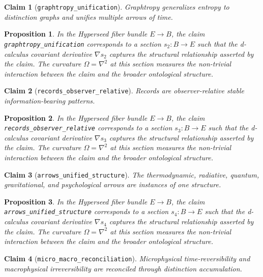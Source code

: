 \documentclass{article}
\newtheorem{claim}{Claim}
\newtheorem{proposition}{Proposition}
\begin{document}
\begin{claim}[\texttt{graphtropy_unification}]
Graphtropy generalizes entropy to distinction graphs and unifies multiple arrows of time.
\end{claim}

\begin{proposition}
In the Hyperseed fiber bundle $E \to B$, the claim \texttt{graphtropy_unification} corresponds to a section $s_2: B \to E$ such that the d-calculus covariant derivative $\nabla s_2$ captures the structural relationship asserted by the claim. The curvature $\Omega = \nabla^2$ at this section measures the non-trivial interaction between the claim and the broader ontological structure.
\end{proposition}

\begin{claim}[\texttt{records_observer_relative}]
Records are observer-relative stable information-bearing patterns.
\end{claim}

\begin{proposition}
In the Hyperseed fiber bundle $E \to B$, the claim \texttt{records_observer_relative} corresponds to a section $s_3: B \to E$ such that the d-calculus covariant derivative $\nabla s_3$ captures the structural relationship asserted by the claim. The curvature $\Omega = \nabla^2$ at this section measures the non-trivial interaction between the claim and the broader ontological structure.
\end{proposition}

\begin{claim}[\texttt{arrows_unified_structure}]
The thermodynamic, radiative, quantum, gravitational, and psychological arrows are instances of one structure.
\end{claim}

\begin{proposition}
In the Hyperseed fiber bundle $E \to B$, the claim \texttt{arrows_unified_structure} corresponds to a section $s_4: B \to E$ such that the d-calculus covariant derivative $\nabla s_4$ captures the structural relationship asserted by the claim. The curvature $\Omega = \nabla^2$ at this section measures the non-trivial interaction between the claim and the broader ontological structure.
\end{proposition}

\begin{claim}[\texttt{micro_macro_reconciliation}]
Microphysical time-reversibility and macrophysical irreversibility are reconciled through distinction accumulation.
\end{claim}
\end{document}
